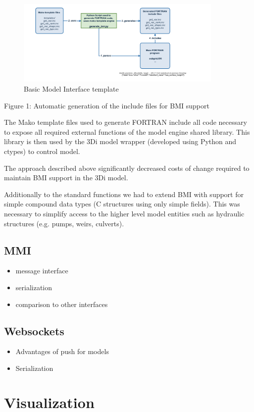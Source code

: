 \documentclass[a4paper]{article}
\begin{document}
\begin{figure}[h]
  \centering
  \includegraphics[width=10cm]{bmi_3di}
  \caption{Basic Model Interface template}
  \label{fig:bmi}
\end{figure}

Figure 1: Automatic generation of the include files for \ac{BMI} support

The Mako template files used to generate FORTRAN include all code necessary to expose all required external functions of the model engine shared library. This library is then used by the 3Di model wrapper (developed using Python and ctypes) to control model.

The approach described above significantly decreased costs of change required to maintain \ac{BMI} support in the 3Di model.

Additionally to the standard functions we had to extend BMI with support for simple compound data types (C structures using only simple fields). This was necessary to simplify access to the higher level model entities such as hydraulic structures (e.g. pumps, weirs, culverts).

\subsection{MMI}
\begin{itemize}
  \item message interface
  \item serialization
  \item comparison to other interfaces
\end{itemize}
\subsection{Websockets}
\begin{itemize}
  \item Advantages of push for models
  \item Serialization
\end{itemize}
\section{Visualization}
\end{document}
